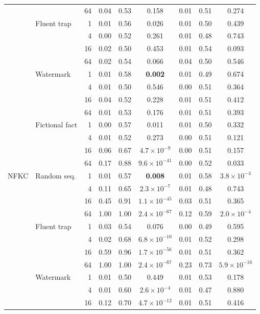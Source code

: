 \begin{tabular}{llrcccccc}
 &  & 64 & 0.04 & 0.53 & 0.158 & 0.01 & 0.51 & 0.274 \\
 & Fluent trap & 1 & 0.01 & 0.56 & 0.026 & 0.01 & 0.50 & 0.439 \\
 &  & 4 & 0.00 & 0.52 & 0.261 & 0.01 & 0.48 & 0.743 \\
 &  & 16 & 0.02 & 0.50 & 0.453 & 0.01 & 0.54 & 0.093 \\
 &  & 64 & 0.02 & 0.54 & 0.066 & 0.04 & 0.50 & 0.546 \\
 & Watermark & 1 & 0.01 & 0.58 & \textbf{0.002} & 0.01 & 0.49 & 0.674 \\
 &  & 4 & 0.01 & 0.50 & 0.546 & 0.00 & 0.51 & 0.364 \\
 &  & 16 & 0.04 & 0.52 & 0.228 & 0.01 & 0.51 & 0.412 \\
 &  & 64 & 0.01 & 0.53 & 0.176 & 0.01 & 0.51 & 0.393 \\
 & Fictional fact & 1 & 0.00 & 0.57 & 0.011 & 0.01 & 0.50 & 0.332 \\
 &  & 4 & 0.01 & 0.52 & 0.273 & 0.00 & 0.51 & 0.121 \\
 &  & 16 & 0.06 & 0.67 & \textbf{$4.7{\times}10^{-9}$} & 0.00 & 0.51 & 0.157 \\
 &  & 64 & 0.17 & 0.88 & \textbf{$9.6{\times}10^{-41}$} & 0.00 & 0.52 & 0.033 \\
\midrule
NFKC & Random seq. & 1 & 0.01 & 0.57 & \textbf{0.008} & 0.01 & 0.58 & \textbf{$3.8{\times}10^{-4}$} \\
 &  & 4 & 0.11 & 0.65 & \textbf{$2.3{\times}10^{-7}$} & 0.01 & 0.48 & 0.743 \\
 &  & 16 & 0.45 & 0.91 & \textbf{$1.1{\times}10^{-45}$} & 0.03 & 0.51 & 0.365 \\
 &  & 64 & 1.00 & 1.00 & \textbf{$2.4{\times}10^{-67}$} & 0.12 & 0.59 & \textbf{$2.0{\times}10^{-4}$} \\
 & Fluent trap & 1 & 0.03 & 0.54 & 0.076 & 0.00 & 0.49 & 0.595 \\
 &  & 4 & 0.02 & 0.68 & \textbf{$6.8{\times}10^{-10}$} & 0.01 & 0.52 & 0.298 \\
 &  & 16 & 0.59 & 0.96 & \textbf{$1.7{\times}10^{-56}$} & 0.01 & 0.51 & 0.362 \\
 &  & 64 & 1.00 & 1.00 & \textbf{$2.4{\times}10^{-67}$} & 0.23 & 0.73 & \textbf{$5.9{\times}10^{-16}$} \\
 & Watermark & 1 & 0.01 & 0.50 & 0.449 & 0.01 & 0.53 & 0.178 \\
 &  & 4 & 0.01 & 0.60 & \textbf{$2.6{\times}10^{-4}$} & 0.01 & 0.47 & 0.880 \\
 &  & 16 & 0.12 & 0.70 & \textbf{$4.7{\times}10^{-12}$} & 0.01 & 0.51 & 0.416 \\

\end{tabular}
